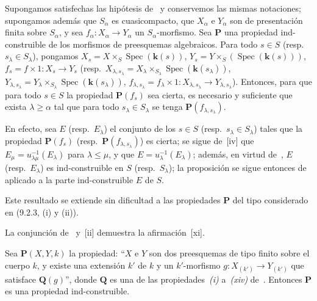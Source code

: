 \begin{proposition}[9.3.3]
\label{IV.9.3.3}
Supongamos satisfechas las hipótesis de~ y conservemos las mismas notaciones; supongamos además que $S_\alpha$ es cuasicompacto, que $X_\alpha$ e $Y_\alpha$ son de presentación finita sobre $S_\alpha$, y sea $f_\alpha:X_\alpha\to Y_\alpha$ un $S_\alpha$-morfismo.
Sea $\boldsymbol{P}$ una propiedad ind-construible de los morfismos de preesquemas algebraicos.
Para todo $s\in S$ \textnormal{(resp.}\ $s_\lambda\in S_\lambda$\textnormal{)}, pongamos $X_s=X\times_S\operatorname{Spec}(\boldsymbol{k}(s))$, $Y_s=Y\times_S(\operatorname{Spec}(\boldsymbol{k}(s)))$, $f_s=f\times 1:X_s\to Y_s$ \textnormal{(resp.}\ $X_{\lambda,s_\lambda}=X_\lambda\times_{S_\lambda}\operatorname{Spec}(\boldsymbol{k}(s_\lambda))$, $Y_{\lambda,s_\lambda}=Y_\lambda\times_{S_\lambda}\operatorname{Spec}(\boldsymbol{k}(s_\lambda))$, $f_{\lambda,s_\lambda}=f_\lambda\times 1:X_{\lambda,s_\lambda}\to Y_{\lambda,s_\lambda}$\textnormal{)}.
Entonces, para que para todo $s\in S$ la propiedad $\boldsymbol{P}(f_s)$ sea cierta, es necesario y suficiente que exista $\lambda\geqslant\alpha$ tal que para todo $s_\lambda\in S_\lambda$ se tenga $\boldsymbol{P}(f_{\lambda,s_\lambda})$.
\end{proposition}

En efecto, sea $E$ (resp.\ $E_\lambda$) el conjunto de los $s\in S$ (resp.\ $s_\lambda\in S_\lambda$) tales que la propiedad $\boldsymbol{P}(f_s)$ (resp.\ $\boldsymbol{P}(f_{\lambda,s_\lambda})$) es cierta; se sigue de~[iv] que $E_\mu=u_{\lambda\mu}^{-1}(E_\lambda)$ para $\lambda\leqslant\mu$, y que $E=u_\lambda^{-1}(E_\lambda)$; además, en virtud de~, $E$ (resp.\ $E_\lambda$) es ind-construible en $S$ (resp.\ $S_\lambda$); la proposición se sigue entonces de~ aplicado a la parte ind-construible $E$ de $S$.


Este resultado se extiende sin dificultad a las propiedades $\boldsymbol{P}$ del tipo considerado en (9.2.3, (i) y (ii)).

\begin{remark}[9.3.4]
\label{IV.9.3.4}
La conjunción de~ y~[ii] demuestra la afirmación~[xi].
\end{remark}

\begin{proposition}[9.3.5]
\label{IV.9.3.5}
Sea $\boldsymbol{P}(X,Y,k)$ la propiedad: ``$X$ e $Y$ son dos preesquemas de tipo finito sobre el cuerpo $k$, y existe una extensión $k'$ de $k$ y un $k'$-morfismo $g:X_{(k')}\to Y_{(k')}$ que satisface $\boldsymbol{Q}(g)$'', donde $\boldsymbol{Q}$ es una de las propiedades~\emph{(i)} a~\emph{(xiv)} de~.
Entonces $\boldsymbol{P}$ es una propiedad ind-construible.
\end{proposition}

